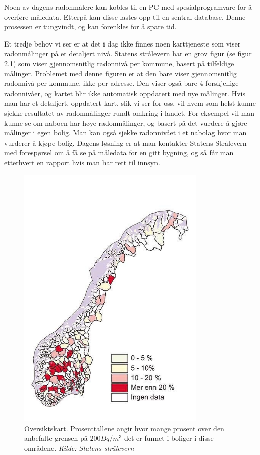 Noen av dagens radonmålere kan kobles til en PC med spesialprogramvare for å overføre måledata. Etterpå kan disse lastes opp til en sentral database. Denne prosessen er tungvindt, og kan forenkles for å spare tid.


Et tredje behov vi ser er at det i dag ikke finnes noen karttjeneste som viser radonmålinger på et detaljert nivå. Statens strålevern har en grov figur (se figur 2.1) som viser gjennomsnitlig radonnivå per kommune, basert på tilfeldige målinger. Problemet med denne figuren er at den bare viser gjennomsnitlig radonnivå per kommune, ikke per adresse. Den viser også bare 4 forskjellige radonnivåer, og kartet blir ikke automatisk oppdatert med nye målinger. Hvis man har et detaljert, oppdatert kart, slik vi ser for oss, vil hvem som helst kunne sjekke resultatet av radonmålinger rundt omkring i landet. For eksempel vil man kunne se om naboen har høye radonmålinger, og basert på det vurdere å gjøre målinger i egen bolig. Man kan også sjekke radonnivået i et nabolag hvor man vurderer å kjøpe bolig. Dagens løsning er at man kontakter Statens Strålevern med forespørsel om å få se på måledata for en gitt bygning, og så får man etterhvert en rapport hvis man har rett til innsyn.

\begin{figure}[ht!]
\centering
\includegraphics[width=90mm]{straleskart.jpg}
\caption{Oversiktskart. Prosenttallene angir hvor mange prosent over den anbefalte grensen på $200Bq/m^3$ det er funnet i boliger i disse områdene.
\textit{Kilde: Statens strålevern}
}
\label{overflow}
\end{figure}


